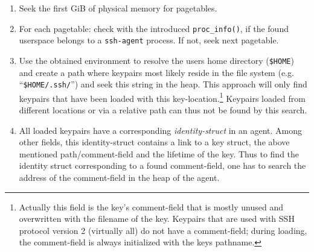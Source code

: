 \begin{enumerate}

	\item Seek the first GiB of physical memory for pagetables.

	\item For each pagetable: check with the introduced
		\texttt{proc\_info()}, if the found userspace belongs to a
		\texttt{ssh-agent} process. If not, seek next pagetable.

	\item Use the obtained environment to resolve the users home directory
		(\texttt{\$HOME}) and create a path where keypairs most likely
		reside in the file system (e.g\@. ``\texttt{\$HOME/.ssh/}'') and
		seek this string in the heap.  This approach will only find
		keypairs that have been loaded with this
		key-location.\footnote{Actually this field is the key's
		comment-field that is mostly unused and overwritten with the
		filename of the key. Keypairs that are used with SSH protocol
		version 2 (virtually all) do not have a comment-field; during
		loading, the comment-field is always initialized with the keys
		pathname.} Keypairs loaded from different locations or via a
		relative path can thus not be found by this search.
	
	\item All loaded keypairs have a corresponding \emph{identity-struct} in an
	agent. %
	Among other fields, this identity-struct contains a link to a key struct, the
	above mentioned path/comment-field and the lifetime of the key. Thus to find
	the identity struct corresponding to a found comment-field, one has to search
	the address of the comment-field in the heap of the agent.

%
%
	

\end{enumerate}
